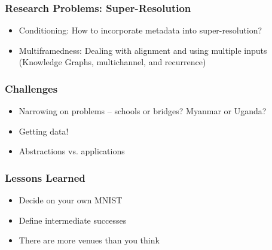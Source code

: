 \documentclass[10pt,mathserif]{beamer}
\begin{document}
\begin{frame}
  \frametitle{Research Problems: Super-Resolution}
  \begin{itemize}
  \item Conditioning: How to incorporate metadata into super-resolution?
  \item Multiframedness: Dealing with alignment and using multiple inputs
    (Knowledge Graphs, multichannel, and recurrence)
  \end{itemize}
\end{frame}

\begin{frame}
  \frametitle{Challenges}
  \begin{itemize}
  \item Narrowing on problems -- schools or bridges? Myanmar or Uganda?
  \item Getting data!
  \item Abstractions vs. applications
  \end{itemize}
\end{frame}

\begin{frame}
  \frametitle{Lessons Learned}
  \begin{itemize}
  \item Decide on your own MNIST
  \item Define intermediate successes
  \item There are more venues than you think
  \end{itemize}
\end{frame}
\end{document}
